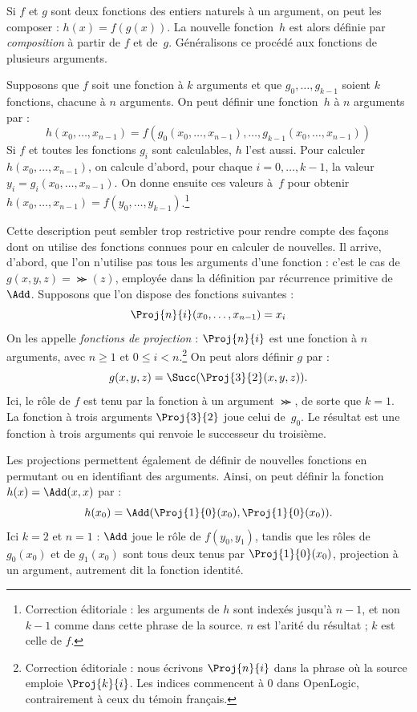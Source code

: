 \documentclass[../../../include/open-logic-section]{subfiles}
\begin{document}

Si $f$ et $g$ sont deux fonctions des entiers naturels à un
argument, on peut les composer : $h(x)=f(g(x))$. La nouvelle
fonction~$h$ est alors définie par \emph{composition} à partir
de $f$ et de~$g$. Généralisons ce procédé aux fonctions de
plusieurs arguments.

Supposons que $f$ soit une fonction à $k$ arguments et que
$g_0,\dots,g_{k-1}$ soient $k$ fonctions, chacune à $n$
arguments. On peut définir une fonction~$h$ à $n$ arguments par :
\[
h(x_0, \dots, x_{n-1}) =
f(g_0(x_0, \dots, x_{n-1}), \dots, g_{k-1}(x_0, \dots, x_{n-1}))
\]
Si $f$ et toutes les fonctions $g_i$ sont calculables, $h$ l'est
aussi. Pour calculer $h(x_0,\dots,x_{n-1})$, on calcule d'abord,
pour chaque $i=0,\dots,k-1$, la valeur
$y_i=g_i(x_0,\dots,x_{n-1})$. On donne ensuite ces valeurs à~$f$
pour obtenir $h(x_0,\dots,x_{n-1})=f(y_0,\dots,y_{k-1})$.\footnote{Correction éditoriale : les arguments de $h$ sont indexés jusqu'à $n-1$, et non $k-1$ comme dans cette phrase de la source. $n$ est l'arité du résultat ; $k$ est celle de $f$.}

Cette description peut sembler trop restrictive pour rendre compte
des façons dont on utilise des fonctions connues pour en calculer
de nouvelles. Il arrive, d'abord, que l'on n'utilise pas tous les
arguments d'une fonction : c'est le cas de $g(x,y,z)=\Succ(z)$,
employée dans la définition par récurrence primitive de~$\Add$.
Supposons que l'on dispose des fonctions suivantes :
\[
\Proj{n}{i}(x_0, \dots, x_{n-1}) = x_i
\]
On les appelle \emph{fonctions de projection} : $\Proj{n}{i}$
est une fonction à $n$ arguments, avec $n\geq1$ et $0\leq i<n$.\footnote{Correction éditoriale : nous écrivons $\Proj{n}{i}$ dans la phrase où la source emploie $\Proj{k}{i}$. Les indices commencent à $0$ dans OpenLogic, contrairement à ceux du témoin français.} On peut alors définir $g$ par :
\[
g(x, y, z) = \Succ(\Proj{3}{2}(x, y, z)).
\]
Ici, le rôle de $f$ est tenu par la fonction à un argument
$\Succ$, de sorte que $k=1$. La fonction à trois arguments
$\Proj{3}{2}$ joue celui de~$g_0$. Le résultat est une fonction
à trois arguments qui renvoie le successeur du troisième.

Les projections permettent également de définir de nouvelles
fonctions en permutant ou en identifiant des arguments. Ainsi,
on peut définir la fonction $h(x)=\Add(x,x)$ par :
\[
h(x_0) = \Add(\Proj{1}{0}(x_0),\Proj{1}{0}(x_0)).
\]
Ici $k=2$ et $n=1$ : $\Add$ joue le rôle de $f(y_0,y_1)$,
tandis que les rôles de $g_0(x_0)$ et de $g_1(x_0)$ sont tous deux
tenus par $\Proj{1}{0}(x_0)$, projection à un argument, autrement
dit la fonction identité.
\end{document}
